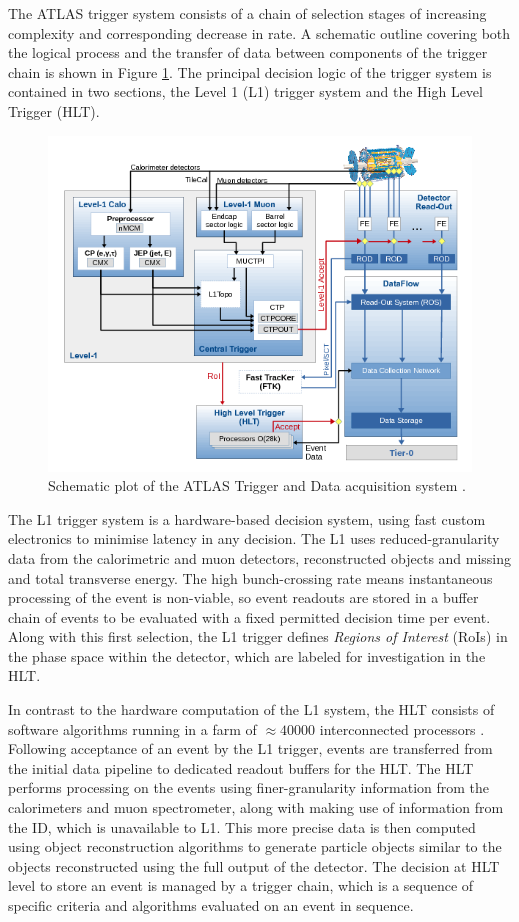 	The ATLAS trigger system consists of a chain of selection stages of increasing complexity and corresponding decrease in rate. A schematic outline covering both the logical process and the transfer of data between components of the trigger chain is shown in Figure \ref{fig:trigschem}. The principal decision logic of the trigger system is contained in two sections, the Level 1 (L1) trigger system and the High Level Trigger (HLT).

	\begin{figure}
		\centering
		\includegraphics[width=0.9\linewidth]{D/FIGS/trigschem}
		\caption[Schematic plot of the ATLAS Trigger and Data acquisition system]{Schematic plot of the ATLAS Trigger and Data acquisition system \cite{trig2015}.}
		\label{fig:trigschem}
		\end{figure}

	The L1 trigger system \cite{L1} is a hardware-based decision system, using fast custom electronics to minimise latency in any decision. The L1 uses reduced-granularity data from the calorimetric and muon detectors, reconstructed objects and missing and total transverse energy. The high bunch-crossing rate means instantaneous processing of the event is non-viable, so event readouts are stored in a buffer chain of events to be evaluated with a fixed permitted decision time per event. Along with this first selection, the L1 trigger defines \textit{Regions of Interest} (RoIs) in the phase space within the detector, which are labeled for investigation in the HLT.

	In contrast to the hardware computation of the L1 system, the HLT consists of software algorithms running in a farm  of $\approx40000$ interconnected processors \cite{trigrun2017}. Following acceptance of an event by the L1 trigger, events are transferred from the initial data pipeline to dedicated readout buffers for the HLT. The HLT performs processing on the events using finer-granularity information from the calorimeters and muon spectrometer, along with making use of information from the ID, which is unavailable to L1. This more precise data is then computed using object reconstruction algorithms to generate particle objects similar to the objects reconstructed using the full output of the detector. The decision at HLT level to store an event is managed by a trigger chain, which is a sequence of specific criteria and algorithms evaluated on an event in sequence.

